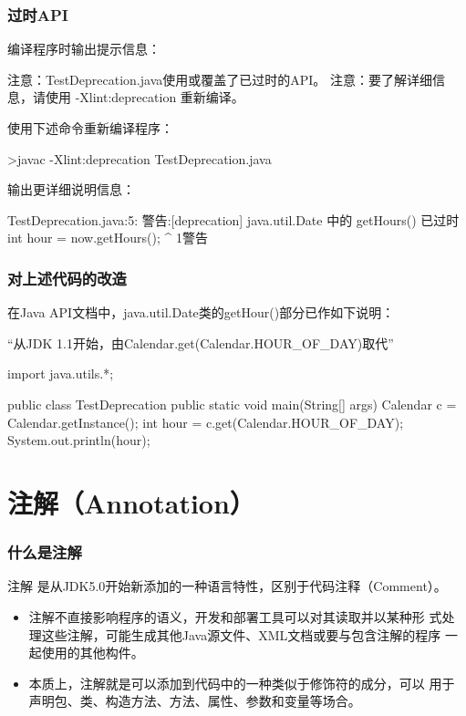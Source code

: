 \begin{frame}[fragile] %
  \frametitle{过时API}

  编译程序时输出提示信息：
  \begin{stdoutCode}
    注意：TestDeprecation.java使用或覆盖了已过时的API。 
    注意：要了解详细信息，请使用 -Xlint:deprecation 重新编译。
  \end{stdoutCode}

  使用下述命令重新编译程序：
  \begin{shCode}
    >javac -Xlint:deprecation TestDeprecation.java  
  \end{shCode}

  输出更详细说明信息：

  \begin{stdoutCode}
    TestDeprecation.java:5: 警告:[deprecation] java.util.Date 中的 
    getHours() 已过时  
    int hour = now.getHours(); ^
    1警告
  \end{stdoutCode}
\end{frame}

\begin{frame}[fragile] %
  \frametitle{对上述代码的改造}

  在Java API文档中，java.util.Date类的getHour()部分已作如下说明：

  {\kai “从JDK 1.1开始，由Calendar.get(Calendar.HOUR\_OF\_DAY)取代”}
  \begin{javaCode}
    import java.utils.*;

    public class TestDeprecation {
      public static void main(String[] args) {
        Calendar c = Calendar.getInstance();
        int hour = c.get(Calendar.HOUR_OF_DAY);
        System.out.println(hour);
      }
    }  
  \end{javaCode}
\end{frame}

\section{注解（Annotation）}

\begin{frame}[fragile] %
  \frametitle{什么是注解}

  \begin{block}{注解}
    是从JDK5.0开始新添加的一种语言特性，区别于代码注释（Comment）。
  \end{block}

  \begin{itemize}[<+-|alert@+>]
  \item 注解不直接影响程序的语义，开发和部署工具可以对其读取并以某种形
    式处理这些注解，可能生成其他Java源文件、XML文档或要与包含注解的程序
    一起使用的其他构件。
  \item 本质上，注解就是可以添加到代码中的一种类似于修饰符的成分，可以
    用于声明包、类、构造方法、方法、属性、参数和变量等场合。
  \end{itemize}
\end{frame}

